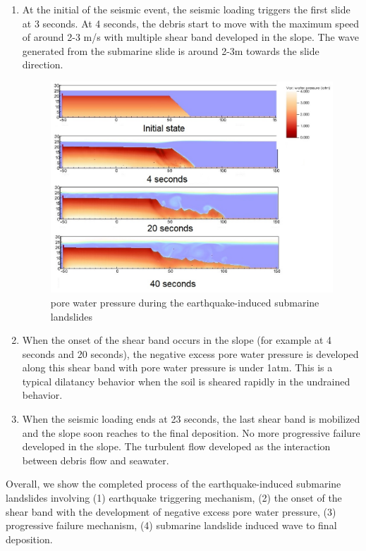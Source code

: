 \documentclass[preprint,12pt]{elsarticle}
\begin{document}
\begin{enumerate}
\item At the initial of the seismic event, the seismic loading triggers the first slide at 3 seconds. At 4 seconds, the debris start to move with the maximum speed of around 2-3 m/s with multiple shear band developed in the slope. The wave generated from the submarine slide is around 2-3m towards the slide direction.
%
\begin{figure}[H]
\center
\includegraphics[scale=0.5]{PWP.jpeg}
\caption{pore water pressure during the earthquake-induced submarine landslides}
\label{fig:PWP}
\end {figure}
%
%
\item When the onset of the shear band occurs in the slope (for example at 4 seconds and 20 seconds), the negative excess pore water pressure is developed along this shear band with pore water pressure is under 1atm. This is a typical dilatancy behavior when the soil is sheared rapidly in the undrained behavior. 
\item  When the seismic loading ends at 23 seconds, the last shear band is mobilized and the slope soon reaches to the final deposition. No more progressive failure developed in the slope. The turbulent flow developed as the interaction between debris flow and seawater.
\end {enumerate}
%
Overall, we show the completed process of the earthquake-induced submarine landslides involving (1) earthquake triggering mechanism, (2) the onset of the shear band with the development of negative excess pore water pressure, (3) progressive failure mechanism, (4) submarine landslide induced wave to final deposition.
\end{document}
